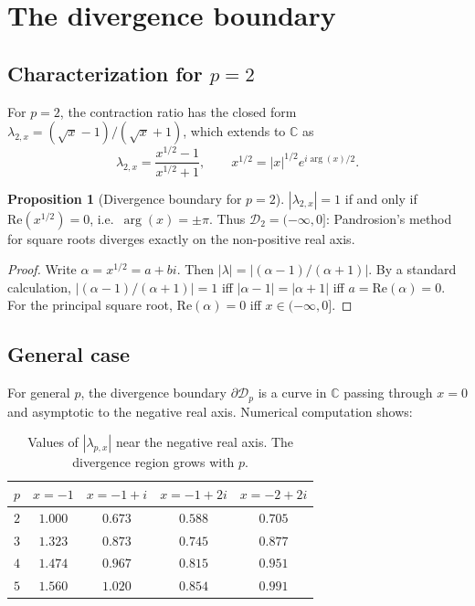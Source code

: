 \documentclass[11pt,a4paper]{article}
\theoremstyle{definition}
\newtheorem{proposition}{Proposition}[section]
\newcommand{\CC}{\mathbb{C}}
\newcommand{\Div}{\mathcal{D}}
\begin{document}
\section{The divergence boundary}
\label{sec:divergence}

\subsection{Characterization for \texorpdfstring{$p = 2$}{p=2}}

For $p = 2$, the contraction ratio has the closed form $\lambda_{2,x} = (\sqrt{x} - 1)/(\sqrt{x} + 1)$, which extends to $\CC$ as
\[
  \lambda_{2,x} = \frac{x^{1/2} - 1}{x^{1/2} + 1},
  \qquad x^{1/2} = |x|^{1/2} e^{i\arg(x)/2}.
\]

\begin{proposition}[Divergence boundary for $p = 2$]
\label{prop:div_p2}
$|\lambda_{2,x}| = 1$ if and only if $\mathrm{Re}(x^{1/2}) = 0$, i.e.\ $\arg(x) = \pm \pi$.  Thus $\Div_2 = (-\infty, 0]$: Pandrosion's method for square roots diverges exactly on the non-positive real axis.
\end{proposition}

\begin{proof}
Write $\alpha = x^{1/2} = a + bi$.  Then $|\lambda| = |(\alpha-1)/(\alpha+1)|$.  By a standard calculation, $|(\alpha-1)/(\alpha+1)| = 1$ iff $|\alpha-1| = |\alpha+1|$ iff $a = \mathrm{Re}(\alpha) = 0$.  For the principal square root, $\mathrm{Re}(\alpha) = 0$ iff $x \in (-\infty, 0]$.
\end{proof}

\subsection{General case}

For general $p$, the divergence boundary $\partial \Div_p$ is a curve in $\CC$ passing through $x = 0$ and asymptotic to the negative real axis.  Numerical computation shows:

\begin{table}[h]
\centering
\begin{tabular}{ccccc}
\toprule
$p$ & $x=-1$ & $x=-1+i$ & $x=-1+2i$ & $x=-2+2i$ \\
\midrule
$2$ & $1.000$ & $0.673$ & $0.588$ & $0.705$ \\
$3$ & $1.323$ & $0.873$ & $0.745$ & $0.877$ \\
$4$ & $1.474$ & $0.967$ & $0.815$ & $0.951$ \\
$5$ & $1.560$ & $1.020$ & $0.854$ & $0.991$ \\
\bottomrule
\end{tabular}
\caption{Values of $|\lambda_{p,x}|$ near the negative real axis.  The divergence region grows with $p$.}
\label{tab:divergence}
\end{table}
\end{document}
